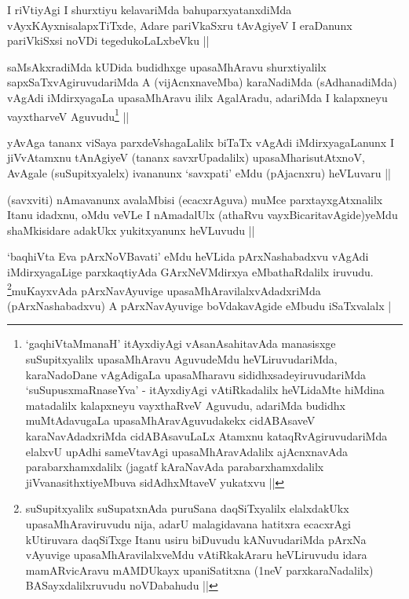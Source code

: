 
\begin{artha}
I riVtiyAgi I shurxtiyu kelavariMda bahuparxyatanxdiMda vAyxKAyxnisalapxTiTxde, Adare pariVkaSxru tAvAgiyeV I eraDanunx pariVkiSxsi noVDi tegedukoLaLxbeVku ||
\end{artha}


\begin{artha}
saMsAkxradiMda kUDida budidhxge upasaMhAravu shurxtiyalilx sapxSaTxvAgiruvudariMda A (vijAcnxnaveMba) karaNadiMda (sAdhanadiMda) vAgAdi iMdirxyagaLa upasaMhAravu ililx AgalAradu, adariMda I kalapxneyu vayxtharveV Aguvudu\footnote{`gaqhiVtaMmanaH' itAyxdiyAgi vAsanAsahitavAda manasisxge suSupitxyalilx upasaMhAravu AguvudeMdu heVLiruvudariMda, karaNadoDane vAgAdigaLa upasaMharavu sididhxsadeyiruvudariMda `suSupusxmaRnaseYva' - itAyxdiyAgi vAtiRkadalilx heVLidaMte hiMdina matadalilx kalapxneyu vayxthaRveV Aguvudu, adariMda budidhx muMtAdavugaLa upasaMhAravAguvudakekx cidABAsaveV karaNavAdadxriMda cidABAsavuLaLx Atamxnu kataqRvAgiruvudariMda elalxvU upAdhi sameVtavAgi upasaMhAravAdalilx ajAcnxnavAda parabarxhamxdalilx (jagatf kAraNavAda parabarxhamxdalilx jiVvanasithxtiyeMbuva sidAdhxMtaveV yukatxvu ||} ||
\end{artha}


\begin{artha}
yAvAga tananx viSaya parxdeVshagaLalilx biTaTx vAgAdi iMdirxyagaLanunx I jiVvAtamxnu tAnAgiyeV (tananx savxrUpadalilx) upasaMharisutAtxnoV, AvAgale (suSupitxyalelx) ivananunx `savxpati' eMdu (pAjacnxru) heVLuvaru ||
\end{artha}


\begin{artha}
(savxviti) nAmavanunx avalaMbisi (ecacxrAguva) muMce parxtayxgAtxnalilx Itanu idadxnu, oMdu veVLe I nAmadalUlx (athaRvu vayxBicaritavAgide)yeMdu shaMkisidare adakUkx yukitxyanunx heVLuvudu ||
\end{artha}


\begin{artha}
`baqhiVta Eva pArxNoVBavati' eMdu heVLida pArxNashabadxvu vAgAdi iMdirxyagaLige parxkaqtiyAda GArxNeVMdirxya eMbathaRdalilx iruvudu. \footnote{suSupitxyalilx suSupatxnAda puruSana daqSiTxyalilx elalxdakUkx upasaMhAraviruvudu nija, adarU malagidavana hatitxra ecacxrAgi kUtiruvara daqSiTxge Itanu usiru biDuvudu kANuvudariMda pArxNa vAyuvige upasaMhAravilalxveMdu vAtiRkakAraru heVLiruvudu idara mamARvicAravu mAMDUkayx upaniSatitxna (1neV parxkaraNadalilx) BASayxdalilxruvudu noVDabahudu ||}muKayxvAda pArxNavAyuvige upasaMhAravilalxvAdadxriMda (pArxNashabadxvu) A pArxNavAyuvige boVdakavAgide eMbudu iSaTxvalalx |
\end{artha}

